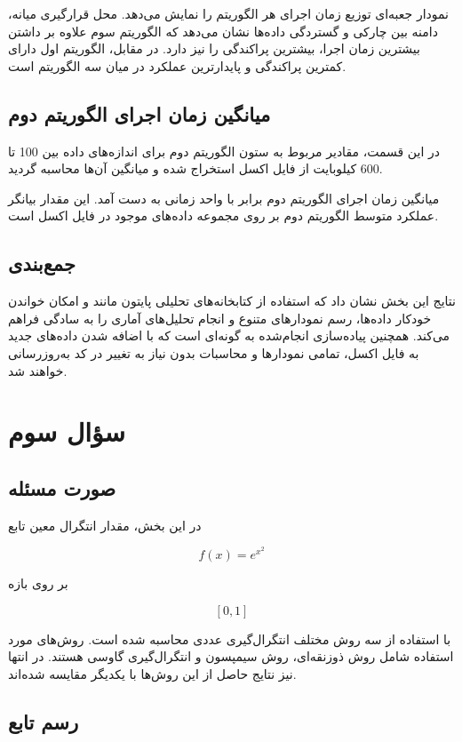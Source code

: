 \documentclass[12pt]{article}
\begin{document}
نمودار جعبه‌ای توزیع زمان اجرای هر الگوریتم را نمایش می‌دهد. محل قرارگیری میانه، دامنه بین چارکی و گستردگی داده‌ها نشان می‌دهد که الگوریتم سوم علاوه بر داشتن بیشترین زمان اجرا، بیشترین پراکندگی را نیز دارد. در مقابل، الگوریتم اول دارای کمترین پراکندگی و پایدارترین عملکرد در میان سه الگوریتم است.

\subsection{میانگین زمان اجرای الگوریتم دوم}

در این قسمت، مقادیر مربوط به ستون الگوریتم دوم برای اندازه‌های داده بین 100 تا 600 کیلوبایت از فایل اکسل استخراج شده و میانگین آن‌ها محاسبه گردید.

میانگین زمان اجرای الگوریتم دوم برابر با  واحد زمانی به دست آمد. این مقدار بیانگر عملکرد متوسط الگوریتم دوم بر روی مجموعه داده‌های موجود در فایل اکسل است.

\subsection{جمع‌بندی}

نتایج این بخش نشان داد که استفاده از کتابخانه‌های تحلیلی پایتون مانند  و  امکان خواندن خودکار داده‌ها، رسم نمودارهای متنوع و انجام تحلیل‌های آماری را به سادگی فراهم می‌کند. همچنین پیاده‌سازی انجام‌شده به گونه‌ای است که با اضافه شدن داده‌های جدید به فایل اکسل، تمامی نمودارها و محاسبات بدون نیاز به تغییر در کد به‌روزرسانی خواهند شد.

\section{سؤال سوم}

\subsection{صورت مسئله}

در این بخش، مقدار انتگرال معین تابع

\[
f(x)=e^{x^2}
\]

بر روی بازه

\[
[0,1]
\]

با استفاده از سه روش مختلف انتگرال‌گیری عددی محاسبه شده است. روش‌های مورد استفاده شامل روش ذوزنقه‌ای، روش سیمپسون و انتگرال‌گیری گاوسی هستند. در انتها نیز نتایج حاصل از این روش‌ها با یکدیگر مقایسه شده‌اند.

\subsection{رسم تابع}
\end{document}
